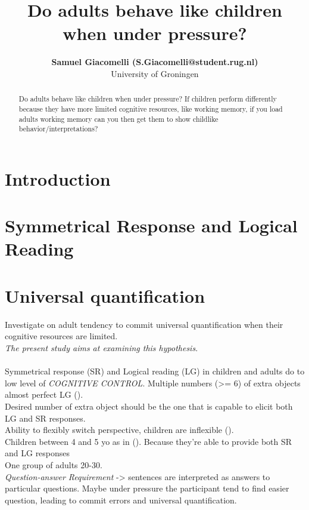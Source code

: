 \documentclass[10pt, a4]{article}
\title{Do adults behave like children when under pressure?}
\author{{\large \bf Samuel Giacomelli (S.Giacomelli@student.rug.nl)} \\
University of Groningen}
\begin{document}
\maketitle

\begin{abstract}
    Do adults behave like children when under pressure? If children perform
    differently because they have more limited cognitive resources, like working
    memory, if you load adults working memory can you then get them to show childlike
    behavior/interpretations?   
\end{abstract}

\section{Introduction}
\section{Symmetrical Response and Logical Reading}

\section{Universal quantification}
Investigate on adult tendency to commit universal quantification when their cognitive resources are limited.\\
\textit{The present study aims at examining this hypothesis}.\\
\\
Symmetrical response (SR) and Logical reading (LG) in children and adults do to low level of \textit{COGNITIVE CONTROL}.
Multiple numbers (>= 6) of extra objects almost perfect LG (\cite{sugisaki2001quantification}).\\
Desired number of extra object should be the one that is capable to elicit both LG and SR responses.\\
Ability to flexibly switch perspective, children are inflexible (\cite{piaget1954language}).\\
Children between 4 and 5 yo as in (\cite{minai2012hinders}). Because they're able to provide both SR and LG responses\\
One group of adults 20-30.\\
\textit{Question-answer Requirement} -> sentences are interpreted as answers to particular questions. Maybe
under pressure the participant tend to find easier question, leading to commit errors and universal quantification.\\
\end{document}
